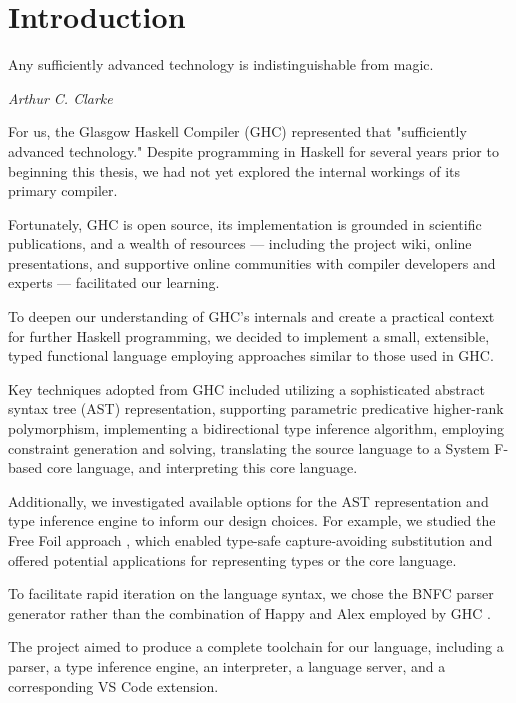 \chapter{Introduction}
\label{chap:Introduction}

\epigraph{Any sufficiently advanced technology is indistinguishable from magic.}{\textit{Arthur C. Clarke}}

For us, the Glasgow Haskell Compiler (GHC) \cite{ghc-site} represented that "sufficiently advanced technology."
Despite programming in Haskell for several years prior to beginning this thesis, we had not yet explored the internal workings of its primary compiler.

Fortunately, GHC is open source, its implementation is grounded in scientific publications, and a wealth of resources --- including the project wiki, online presentations, and supportive online communities with compiler developers and experts --- facilitated our learning.

To deepen our understanding of GHC's internals and create a practical context for further Haskell programming, we decided to implement a small, extensible, typed functional language employing approaches similar to those used in GHC.

Key techniques adopted from GHC included utilizing a sophisticated abstract syntax tree (AST) representation, supporting parametric predicative higher-rank polymorphism, implementing a bidirectional type inference algorithm, employing constraint generation and solving, translating the source language to a System F-based core language, and interpreting this core language.

Additionally, we investigated available options for the AST representation and type inference engine to inform our design choices. For example, we studied the Free Foil approach \cite{kudasov-free-2024}, which enabled type-safe capture-avoiding substitution and offered potential applications for representing types or the core language.

To facilitate rapid iteration on the language syntax, we chose the BNFC parser generator \cite{bnfc-parser-generator} rather than the combination of Happy and Alex employed by GHC \cite{ghc-2025}.

The project aimed to produce a complete toolchain for our language, including a parser, a type inference engine, an interpreter, a language server, and a corresponding VS Code extension.

